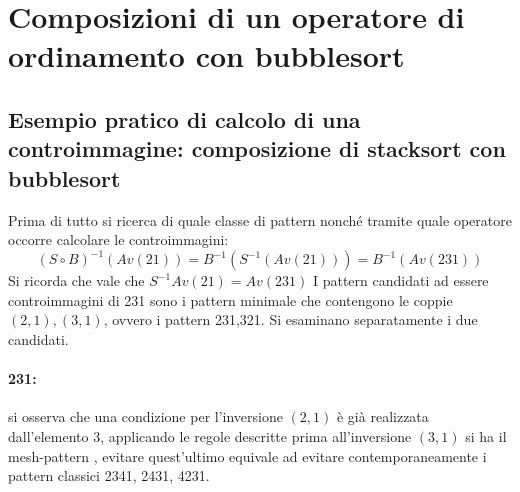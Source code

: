 \section{Composizioni di un operatore di ordinamento con bubblesort}
\subsection{Esempio pratico di calcolo di una controimmagine: composizione di stacksort con bubblesort}
Prima di tutto si ricerca di quale classe di pattern nonch\'e tramite quale operatore occorre calcolare le controimmagini:
$$(S\circ B)^{-1}(Av(21)) = B^{-1}(S^{-1}(Av(21)))=B^{-1}(Av(231))$$
Si ricorda che vale che $S^{-1}Av(21) = Av(231)$
I pattern candidati ad essere controimmagini di 231 sono i pattern minimale che contengono le coppie $(2,1),(3,1)$, ovvero i pattern 231,321. Si esaminano separatamente i due candidati.
\paragraph*{231:} si osserva che una condizione per l'inversione $(2,1)$ \`e gi\`a realizzata dall'elemento $3$, applicando le regole descritte prima all'inversione $(3,1)$ si ha il mesh-pattern , evitare quest'ultimo equivale ad evitare contemporaneamente i pattern classici 2341, 2431, 4231.
